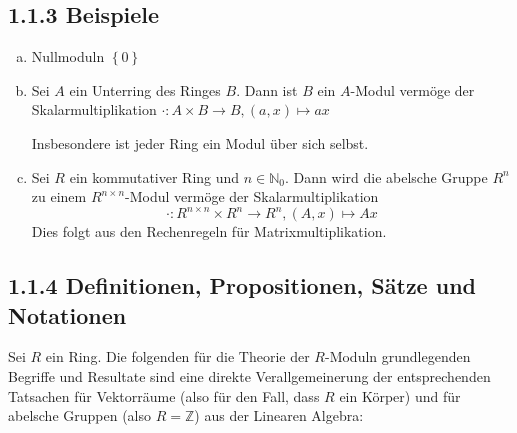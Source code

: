 \documentclass{book}
\newcommand{\N}{\mathbb{N}}
\newcommand{\Z}{\mathbb{Z}}
\newcommand{\set}[1]{\left\{ #1 \right\}}
\begin{document}
	\subsection*{1.1.3 Beispiele}
	\begin{enumerate}[(a)]
		\item Nullmoduln $\set{0}$
		
		\item Sei $A$ ein Unterring des Ringes $B$. Dann ist $B$ ein $A$-Modul verm\"oge der Skalarmultiplikation $\cdot: A \times B \to B, (a, x) \mapsto ax$
		
		Insbesondere ist jeder Ring ein Modul \"uber sich selbst.
		
		\item Sei $R$ ein kommutativer Ring und $n \in \N_0$. Dann wird die abelsche Gruppe $R^n$ zu einem $R^{n\times n}$-Modul verm\"oge der Skalarmultiplikation
			\[\cdot: R^{n\times n} \times R^n \to R^n, (A, x) \mapsto Ax\]
		Dies folgt aus den Rechenregeln f\"ur Matrixmultiplikation.
	\end{enumerate}

	\subsection*{1.1.4 Definitionen, Propositionen, S\"atze und Notationen}
	Sei $R$ ein Ring. Die folgenden f\"ur die Theorie der $R$-Moduln grundlegenden Begriffe und Resultate sind eine direkte Verallgemeinerung der entsprechenden Tatsachen f\"ur Vektorr\"aume (also f\"ur den Fall, dass $R$ ein K\"orper) und f\"ur abelsche Gruppen (also $R = \Z$) aus der Linearen Algebra:
	
\end{document}
